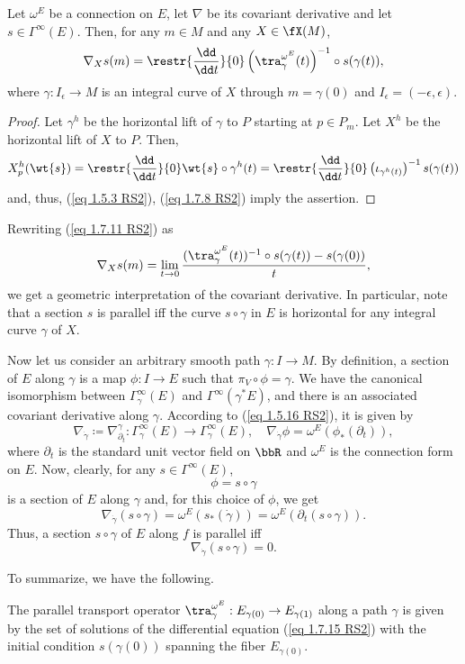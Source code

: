 \begin{prop}[{{\cite[Prop.~1.7.17]{RS2}}}]\label{prop 1.7.17 RS2}
    Let $\omega^E$ be a connection on $E$, let $\nabla$ be its covariant derivative and let $s\in\Gamma^\infty(E)$. Then, for any $m\in M$ and any $X\in\fX(M)$,
    \[\nabla_X s(m)=\restr{\frac{\dd}{\dd t}}{0}\left(\tra_\gamma^{\omega^E}(t)\right)^{-1}\circ s(\gamma(t)),\label{eq 1.7.11 RS2}\]
    where $\gamma:I_\epsilon\to M$ is an integral curve of $X$ through $m=\gamma(0)$ and $I_\epsilon=(-\epsilon,\epsilon)$.
\end{prop}
\begin{proof}
    Let $\gamma^h$ be the horizontal lift of $\gamma$ to $P$ starting at $p\in P_m$. Let $X^h$ be the horizontal lift of $X$ to $P$. Then,
    \[X_p^h(\wt{s})=\restr{\frac{\dd}{\dd t}}{0}\wt{s}\circ \gamma^h(t)=\restr{\frac{\dd}{\dd t}}{0}\left(\iota_{\gamma^h(t)}\right)^{-1}s(\gamma(t))\]
    and, thus, (\ref{eq 1.5.3 RS2}), (\ref{eq 1.7.8 RS2}) imply the assertion.
\end{proof}
Rewriting (\ref{eq 1.7.11 RS2}) as
\[\nabla_X s(m)=\lim_{t\to 0}\frac{(\tra_{\gamma}^{\omega^E}(t))^{-1}\circ s(\gamma(t))-s(\gamma(0))}{t},\]
we get a geometric interpretation of the covariant derivative. In particular, note that a section $s$ is parallel iff the curve $s\circ \gamma$ in $E$ is horizontal for any integral curve $\gamma$ of $X$.

Now let us consider an arbitrary smooth path $\gamma:I\to M$. By definition, a section of $E$ along $\gamma$ is a map $\phi:I\to E$ such that $\pi_V\circ \phi=\gamma$. We have the canonical isomorphism between $\Gamma_\gamma^\infty(E)$ and $\Gamma^\infty(\gamma^\ast E)$, and there is an associated covariant derivative along $\gamma$. According to (\ref{eq 1.5.16 RS2}), it is given by
\[\nabla_{\dot\gamma}\coloneqq \nabla^\gamma_{\partial_t}:\Gamma^\infty_\gamma(E)\to \Gamma^\infty_\gamma(E),\quad \nabla_{\dot\gamma}\phi=\omega^E\left(\phi_\ast(\partial_t)\right),\label{eq 1.7.13 RS2}\]
where $\partial_t$ is the standard unit vector field on $\bbR$ and $\omega^E$ is the connection form on $E$. Now, clearly, for any $s\in\Gamma^\infty(E)$,
\[\phi=s\circ\gamma\]
is a section of $E$ along $\gamma$ and, for this choice of $\phi$, we get
\[\nabla_{\dot\gamma}(s\circ\gamma)=\omega^E(s_\ast(\dot\gamma))=\omega^E(\partial_t(s\circ \gamma)).\label{eq 1.7.14 RS2}\]
Thus, a section $s\circ\gamma$ of $E$ along $f$ is parallel iff
\[\nabla_{\dot\gamma}(s\circ\gamma)=0.\label{eq 1.7.15 RS2}\]

To summarize, we have the following.
\begin{prop}
    The parallel transport operator $\tra_\gamma^{\omega^E}:E_{\gamma(0)}\to E_{\gamma(1)}$ along a path $\gamma$ is given by the set of solutions of the differential equation (\ref{eq 1.7.15 RS2}) with the initial condition $s(\gamma(0))$ spanning the fiber $E_{\gamma(0)}$.
\end{prop}

